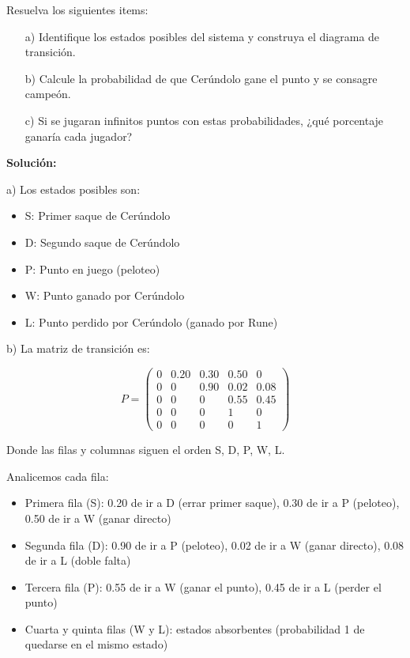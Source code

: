 \documentclass[a4paper,11pt]{article}
\begin{document}
Resuelva los siguientes items:

\begin{itemize}
    \item[a)] Identifique los estados posibles del sistema y construya el diagrama de transición.
    \item[b)] Calcule la probabilidad de que Cerúndolo gane el punto y se consagre campeón.
    \item[c)] Si se jugaran infinitos puntos con estas probabilidades, ¿qué porcentaje ganaría cada jugador?
\end{itemize}

\textbf{Solución:}

\vspace{0.5em}

a) Los estados posibles son:
\begin{itemize}
    \item S: Primer saque de Cerúndolo
    \item D: Segundo saque de Cerúndolo
    \item P: Punto en juego (peloteo)
    \item W: Punto ganado por Cerúndolo
    \item L: Punto perdido por Cerúndolo (ganado por Rune)
\end{itemize}

\vspace{0.5em}

b) La matriz de transición es:

\[P = \begin{pmatrix}
0 & 0.20 & 0.30 & 0.50 & 0 \\
0 & 0 & 0.90 & 0.02 & 0.08 \\
0 & 0 & 0 & 0.55 & 0.45 \\
0 & 0 & 0 & 1 & 0 \\
0 & 0 & 0 & 0 & 1
\end{pmatrix}\]

\begin{center}
Donde las filas y columnas siguen el orden S, D, P, W, L.
\end{center}

\vspace{0.5em}
Analicemos cada fila:
\begin{itemize}
    \item Primera fila (S): 0.20 de ir a D (errar primer saque), 0.30 de ir a P (peloteo), 0.50 de ir a W (ganar directo)
    \item Segunda fila (D): 0.90 de ir a P (peloteo), 0.02 de ir a W (ganar directo), 0.08 de ir a L (doble falta)
    \item Tercera fila (P): 0.55 de ir a W (ganar el punto), 0.45 de ir a L (perder el punto)
    \item Cuarta y quinta filas (W y L): estados absorbentes (probabilidad 1 de quedarse en el mismo estado)
\end{itemize}
\end{document}
